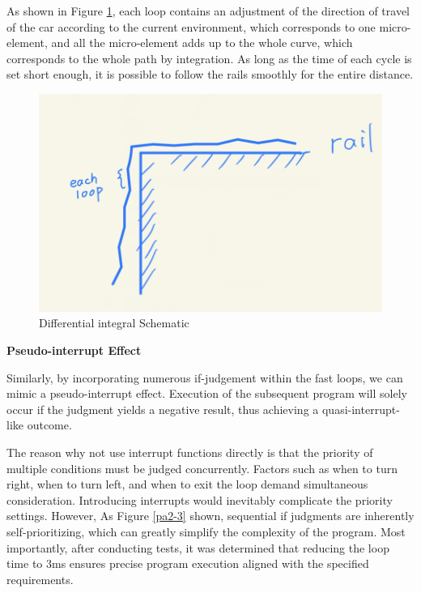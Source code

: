 \documentclass[12pt, a4paper, oneside]{report}
\begin{document}
As shown in Figure \ref{pa2-4}, each loop contains an adjustment of the direction of travel of the car according to the current environment, which corresponds to one micro-element, and all the micro-element adds up to the whole curve, which corresponds to the whole path by integration. As long as the time of each cycle is set short enough, it is possible to follow the rails smoothly for the entire distance.
\begin{figure}[H]
    \centering
    \includegraphics[scale=0.4]{pic/Patio 2/pa2-4.png}
    \caption{Differential integral Schematic}
    \label{pa2-4}
\end{figure}

\textbf{Pseudo-interrupt Effect}
\vspace{0.4em}

Similarly, by incorporating numerous if-judgement within the fast loops, we can mimic a pseudo-interrupt effect. Execution of the subsequent program will solely occur if the judgment yields a negative result, thus achieving a quasi-interrupt-like outcome. 

The reason why not use interrupt functions directly is that the priority of multiple conditions must be judged concurrently. Factors such as when to turn right, when to turn left, and when to exit the loop demand simultaneous consideration. Introducing interrupts would inevitably complicate the priority settings. However, As Figure \ref{pa2-3} shown, sequential if judgments are inherently self-prioritizing, which can greatly simplify the complexity of the program. Most importantly, after conducting tests, it was determined that reducing the loop time to 3ms ensures precise program execution aligned with the specified requirements.
\end{document}
